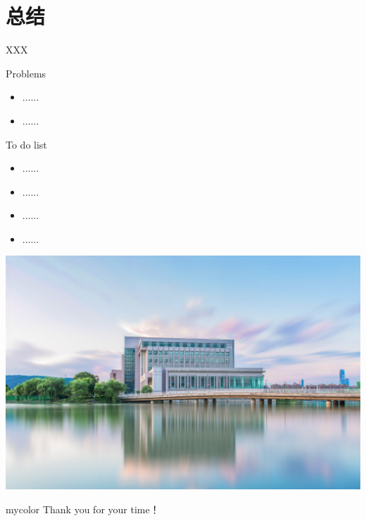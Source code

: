 \documentclass[xcolor=svgnames]{beamer}
\newcommand*{\xinwei}{\CJKfamily{xw}}
\begin{document}
\section{总结}
\begin{frame}{XXX}
\begin{block}{Problems}
	\begin{itemize}
		\item ......
		\item ......
	\end{itemize}
\end{block}
\begin{block}{To do list}
	\begin{itemize}
		\item ......
		\item ......
		\item ......
		\item ......
	\end{itemize}
\end{block}
\end{frame}


\usebackgroundtemplate%
{%
	\includegraphics[width=\paperwidth,height=\paperheight]{bg.png}%
}
\begin{frame}
\begin{beamercolorbox}[rounded=true,shadow=true,wd=\linewidth]{mycolor}
	\xinwei Thank you for your time！
\end{beamercolorbox}
\end{frame}
\addtocounter{framenumber}{-1}
\end{document}
